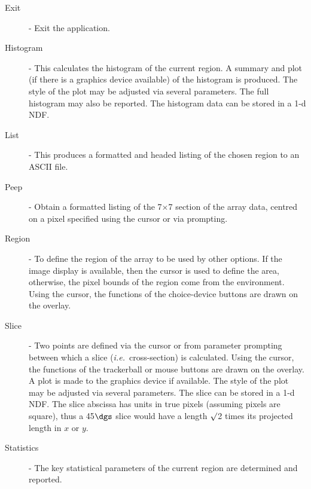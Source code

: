 {{{{\begin{description}
         \item [Exit]   - Exit the application.
         \item [Histogram] - This calculates the histogram of the current
                          region. A summary and plot (if there is a
                          graphics device available) of the histogram
                          is produced.  The style of the plot may be
                          adjusted via several parameters.  The full
                          histogram may also be reported. The histogram
                          data can be stored in a 1-d NDF.
         \item [List]   - This produces a formatted and headed listing
                          of the chosen region to an ASCII file.
         \item [Peep]   - Obtain a formatted listing of the 7$\times$7 section
                          of the array data, centred on a pixel
                          specified using the cursor or via prompting.
         \item [Region] - To define the region of the array to be used
                          by other options. If the image display
                          is available, then the cursor is used to
                          define the area, otherwise, the pixel bounds
                          of the region come from the environment. Using
                          the cursor, the functions of the choice-device
                          buttons are drawn on the overlay.
         \item [Slice]  - Two points are defined via the cursor or from
                          parameter prompting between which a slice ({\it i.e.}\
                          cross-section) is calculated.  Using the
                          cursor, the functions of the trackerball or
                          mouse buttons are drawn on the overlay. A plot
                          is made to the graphics device if available.
                          The style of the plot may be adjusted via
                          several parameters.  The slice can be stored
                          in a 1-d NDF.  The slice abscissa has units in
                          true pixels (assuming pixels are square), thus
                          a 45$\dgs$ slice would have a length $\surd$2
                          times its projected length in $x$ or $y$.
         \item [Statistics] - The key statistical parameters of the current
                          region are determined and reported.

\end{description}}}}}
